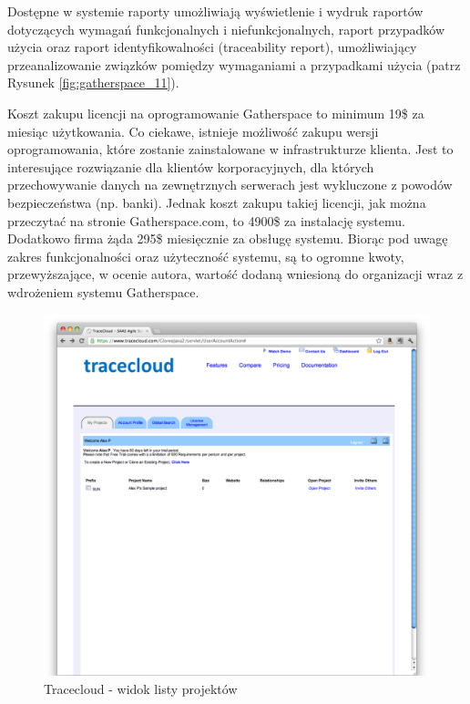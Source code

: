         Dostępne w systemie raporty umożliwiają wyświetlenie i wydruk raportów dotyczących wymagań funkcjonalnych i niefunkcjonalnych, raport przypadków użycia oraz raport identyfikowalności (traceability report), umożliwiający przeanalizowanie związków pomiędzy wymaganiami a przypadkami użycia (patrz Rysunek \ref{fig:gatherspace_11}). 

        \pagebreak

        Koszt zakupu licencji na oprogramowanie Gatherspace to minimum 19\$ za miesiąc użytkowania. Co ciekawe, istnieje możliwość zakupu wersji oprogramowania, które zostanie zainstalowane w infrastrukturze klienta. Jest to interesujące rozwiązanie dla klientów korporacyjnych, dla których przechowywanie danych na zewnętrznych serwerach jest wykluczone z powodów bezpieczeństwa (np. banki). Jednak koszt zakupu takiej licencji, jak można przeczytać na stronie Gatherspace.com, to 4900\$ za instalację systemu. Dodatkowo firma żąda 295\$ miesięcznie za obsługę systemu. Biorąc pod uwagę zakres funkcjonalności oraz użyteczność systemu, są to ogromne kwoty, przewyższające, w ocenie autora, wartość dodaną wniesioną do organizacji wraz z wdrożeniem systemu Gatherspace.
         
        \begin{figure}[t]
          \centering
          \includegraphics[width=1.0\textwidth]{img/tracecloud_1.pdf}
          \caption{Tracecloud - widok listy projektów}
          \label{fig:tracecloud_1}
        \end{figure}

